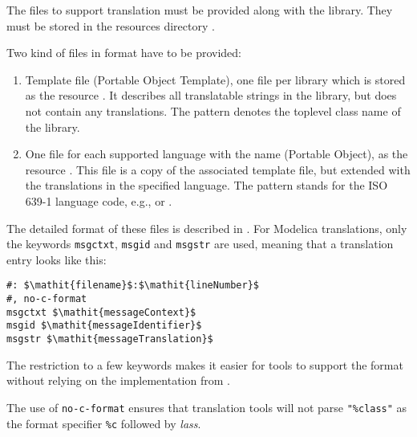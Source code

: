 The files to support translation must be provided along with the library.
They must be stored in the resources directory .

Two kind of files in \textcite{GettextManual} format have to be provided:
\begin{enumerate}
\item Template file  (Portable Object Template), one file per library which is stored as the resource .
It describes all translatable strings in the library, but does not contain any translations.
The pattern  denotes the toplevel class name of the library.
\item One file for each supported language with the name  (Portable Object), as the resource .
This file is a copy of the associated template file, but extended with the translations in the specified language.
The pattern  stands for the ISO 639-1 language code, e.g.,  or .
\end{enumerate}

The detailed format of these files is described in \textcite{GettextManual}.
For Modelica translations, only the keywords \lstinline!msgctxt!, \lstinline!msgid! and \lstinline!msgstr! are used, meaning that a translation entry looks like this:
\begin{lstlisting}
#: $\mathit{filename}$:$\mathit{lineNumber}$
#, no-c-format
msgctxt $\mathit{messageContext}$
msgid $\mathit{messageIdentifier}$
msgstr $\mathit{messageTranslation}$
\end{lstlisting}
The restriction to a few keywords makes it easier for tools to support the format without relying on the implementation from \textcite{GettextManual}.

The use of \lstinline!no-c-format! ensures that translation tools will not parse \lstinline!"%class"! as the format specifier \lstinline!%c! followed by \emph{lass}.


